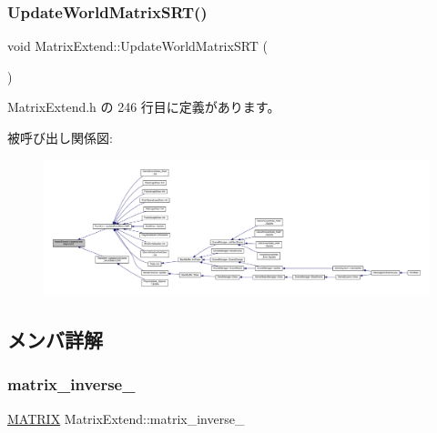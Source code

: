 \subsubsection{\texorpdfstring{Update\+World\+Matrix\+S\+R\+T()}{UpdateWorldMatrixSRT()}}
{\footnotesize\ttfamily void Matrix\+Extend\+::\+Update\+World\+Matrix\+S\+RT (\begin{DoxyParamCaption}{ }\end{DoxyParamCaption})\hspace{0.3cm}{\ttfamily [inline]}}



 Matrix\+Extend.\+h の 246 行目に定義があります。

被呼び出し関係図\+:
\nopagebreak
\begin{figure}[H]
\begin{center}
\leavevmode
\includegraphics[width=350pt]{class_matrix_extend_a4c92a6d037b00bc2514064e00323c5dd_icgraph}
\end{center}
\end{figure}


\subsection{メンバ詳解}
\mbox{\label{class_matrix_extend_a5b0c6e48cb1c541aabe7173378b7bc36}} 
\subsubsection{\texorpdfstring{matrix\+\_\+inverse\+\_\+}{matrix\_inverse\_}}
{\footnotesize\ttfamily \mbox{\hyperlink{_vector3_d_8h_a032295cd9fb1b711757c90667278e744}{M\+A\+T\+R\+IX}} Matrix\+Extend\+::matrix\+\_\+inverse\+\_\+\hspace{0.3cm}{\ttfamily [private]}}



